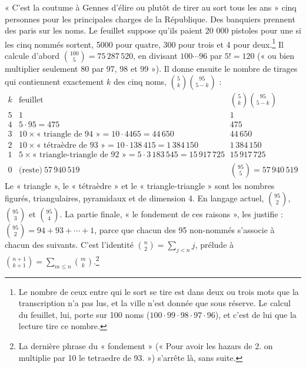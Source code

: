 \documentclass[11pt,a4paper]{article}
\begin{document}
« C'est la coutume à Gennes d'élire ou plutôt de tirer au sort tous les ans »
cinq personnes pour les principales charges de la République. Des banquiers
prennent des paris sur les noms. Le feuillet suppose qu'ils paient 20 000
pistoles pour une si les cinq nommés sortent, 5000 pour quatre, 300 pour trois
et 4 pour deux.\footnote{Le nombre de ceux entre qui le sort se tire est dans
deux ou trois mots que la transcription n'a pas lus, et la ville n'est donnée
que sous réserve. Le calcul du feuillet, lui, porte sur 100 noms (\(100\cdot99
\cdot98\cdot97\cdot96\)), et c'est de lui que la lecture tire ce nombre.} Il
calcule d'abord \(\binom{100}{5}=75\,287\,520\), en divisant
\(100\cdots96\) par \(5!=120\) (« ou bien multiplier seulement 80 par 97, 98 et
99 »). Il donne ensuite le nombre de tirages qui contiennent exactement \(k\)
des cinq noms, \(\binom5k\binom{95}{5-k}\) :
\[
\begin{array}{c|c|c}
k & \text{feuillet} & \binom5k\binom{95}{5-k}\\
\hline
5 & 1 & 1\\
4 & 5\cdot95=475 & 475\\
3 & 10\times\text{« triangle de 94 »}=10\cdot4465=44\,650 & 44\,650\\
2 & 10\times\text{« tétraèdre de 93 »}=10\cdot138\,415=1\,384\,150 & 1\,384\,150\\
1 & 5\times\text{« triangle-triangle de 92 »}=5\cdot3\,183\,545=15\,917\,725 & 15\,917\,725\\
0 & \text{(reste)}\ 57\,940\,519 & \binom{95}{5}=57\,940\,519
\end{array}
\]
Le « triangle », le « tétraèdre » et le « triangle-triangle » sont les nombres
figurés, triangulaires, pyramidaux et de dimension 4. En langage actuel,
\(\binom{95}{2}\), \(\binom{95}{3}\) et \(\binom{95}{4}\). La partie finale, « le
fondement de ces raisons », les justifie : \(\binom{95}{2}=94+93+\cdots+1\),
parce que chacun des 95 non-nommés s'associe à chacun des suivants. C'est
l'identité \(\binom{n}{2}=\sum_{j<n}j\), prélude à
\(\binom{n+1}{k+1}=\sum_{m\le n}\binom{m}{k}\).\footnote{La dernière phrase du
« fondement » (« Pour avoir les hazars de 2. on multiplie par 10 le tetraedre
de 93. ») s'arrête là, sans suite.}
\end{document}
